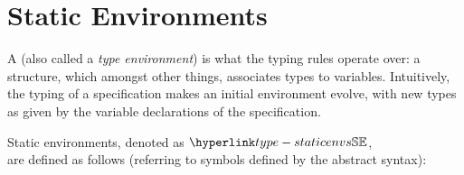 \section{Static Environments\label{sec:StaticEnvironments}}
A \emph{\staticenvironmentterm{}} (also called a \emph{type environment}) is what the typing rules operate over:
a structure, which amongst other things, associates types to variables.
Intuitively, the typing of a specification makes an initial environment evolve, with new types as given by the
variable declarations of the specification.

\begin{definition}
Static environments, denoted as $\staticenvs$, \\
are defined as follows (referring to symbols defined by the abstract syntax):

\end{definition}

